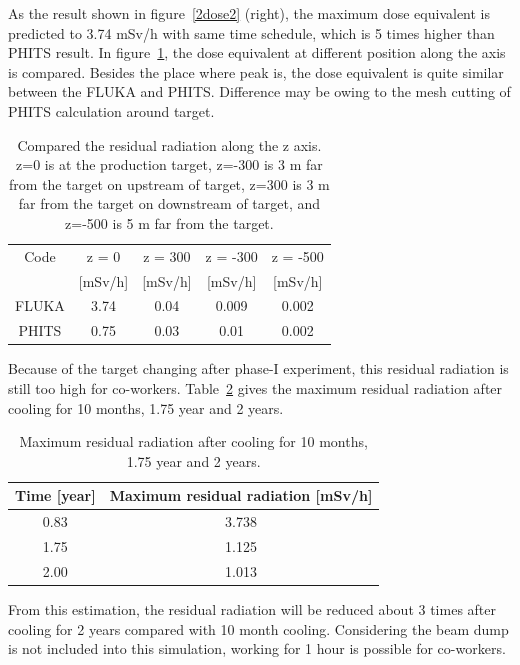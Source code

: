 As the result shown in figure~\ref{2dose2} (right), the maximum dose equivalent is predicted to 3.74 mSv/h with same time schedule, which is 5 times higher than PHITS result.
In figure~\ref{dosepo}, the dose equivalent at different position along the axis is compared.
Besides the place where peak is, the dose equivalent is quite similar between the FLUKA and PHITS.
Difference may be owing to the mesh cutting of PHITS calculation around target.
 \begin{table}[H]
 \centering
 \begin{tabular}{ccccc} \hline \hline
  Code & z = 0 & z = 300 & z = -300 & z = -500 \\
   & [mSv/h] & [mSv/h] & [mSv/h] & [mSv/h] \\ \hline
  FLUKA & 3.74 & 0.04 & 0.009 & 0.002 \\
  PHITS & 0.75 & 0.03 & 0.01 & 0.002 \\ \hline \hline
 \end{tabular}
 \caption{Compared the residual radiation along the z axis. z=0 is at the production target, z=-300 is 3 m far from the target on upstream of target, z=300 is 3 m far from the target on downstream of target, and z=-500 is 5 m far from the target.}
 \label{dosepo}
\end{table}
Because of the target changing after phase-I experiment, this residual radiation is still too high for co-workers.
Table~\ref{2time} gives the maximum residual radiation after cooling for 10 months, 1.75 year and 2 years.
\begin{table}[H]
 \centering
 \begin{tabular}{cc} \hline \hline
  Time [year] & Maximum residual radiation [mSv/h] \\ \hline
  0.83 & 3.738 \\
  1.75 & 1.125 \\
  2.00 & 1.013 \\ \hline \hline
 \end{tabular}
 \caption{Maximum residual radiation after cooling for 10 months, 1.75 year and 2 years.}
 \label{2time}
\end{table}
From this estimation, the residual radiation will be reduced about 3 times after cooling for 2 years compared with 10 month cooling.
Considering the beam dump is not included into this simulation, working for 1 hour is possible for co-workers.


